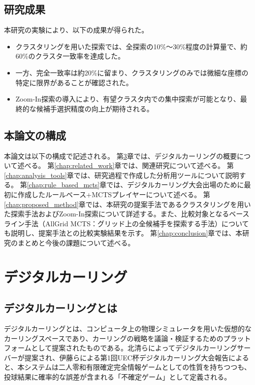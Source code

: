 \documentclass[11pt,a4j]{jreport}
\begin{document}
\section{研究成果}
本研究の実験により、以下の成果が得られた。
\begin{itemize}
    \item クラスタリングを用いた探索では、全探索の10\%〜30\%程度の計算量で、約60\%のクラスタ一致率を達成した。
    \item 一方、完全一致率は約20\%に留まり、クラスタリングのみでは微細な座標の特定に限界があることが確認された。
    \item Zoom-In探索の導入により、有望クラスタ内での集中探索が可能となり、最終的な候補手選択精度の向上が期待される。
\end{itemize}

\section{本論文の構成}
本論文は以下の構成で記述される。
第\ref{chap:digital_curling}章では、デジタルカーリングの概要について述べる。
第\ref{chap:related_work}章では、関連研究について述べる。
第\ref{chap:analysis_tools}章では、研究過程で作成した分析用ツールについて説明する。
第\ref{chap:rule_based_mcts}章では、デジタルカーリング大会出場のために最初に作成したルールベース+MCTSプレイヤーについて述べる。
第\ref{chap:proposed_method}章では、本研究の提案手法であるクラスタリングを用いた探索手法およびZoom-In探索について詳述する。また、比較対象となるベースライン手法（AllGrid MCTS：グリッド上の全候補手を探索する手法）についても説明し、提案手法との比較実験結果を示す。
第\ref{chap:conclusion}章では、本研究のまとめと今後の課題について述べる。



\chapter[デジタルカーリング]{デジタルカーリング}
\label{chap:digital_curling}

\section{デジタルカーリングとは}
デジタルカーリングとは、コンピュータ上の物理シミュレータを用いた仮想的なカーリングスペースであり、カーリングの戦略を議論・検証するためのプラットフォームとして提案されたものである\cite{digitalcurling_server, uec_cup_report}。北清らによってデジタルカーリングサーバーが提案され、伊藤らによる第1回UEC杯デジタルカーリング大会報告によると、本システムは二人零和有限確定完全情報ゲームとしての性質を持ちつつも、投球結果に確率的な誤差が含まれる「不確定ゲーム」として定義される\cite{kato2016}。
\end{document}
